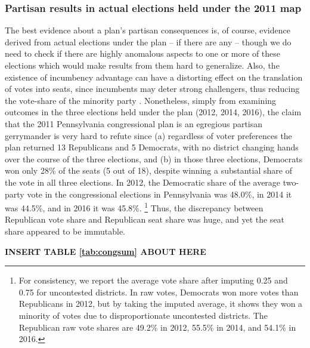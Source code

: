             \subsubsection*{Partisan results in actual elections held under the 2011 map}
%
    The best evidence about a plan’s partisan consequences is, of course, evidence derived from actual elections under the plan -- if there are any -- though we do need to check if there are highly anomalous aspects to one or more of these elections which would make results from them hard to generalize. Also, the existence of incumbency advantage can have a distorting effect on the translation of votes into seats, since incumbents may deter strong challengers, thus reducing the vote-share of the minority party \citep{Jacobson_Kernell_1981, Abramowitz1991}. Nonetheless, simply from examining outcomes in the three elections held under the plan (2012, 2014, 2016), the claim that the 2011 Pennsylvania congressional plan is an egregious partisan gerrymander is very hard to refute since (a) regardless of voter preferences the plan returned 13 Republicans and 5 Democrats, with no district changing hands over the course of the three elections, and (b) in those three elections, Democrats won only 28\% of the seats (5 out of 18), despite winning a substantial share of the vote in all three elections. In 2012, the Democratic share of the average two-party vote in the congressional elections in Pennsylvania was 48.0\%, in 2014 it was 44.5\%, and in 2016 it was 45.8\%. 
        \footnote{For consistency, we report the average vote share after imputing 0.25 and 0.75 for uncontested districts. In raw votes, Democrats won more votes than Republicans in 2012, but by taking the imputed average, it shows they won a minority of votes due to disproportionate uncontested districts. The Republican raw vote shares are 49.2\% in 2012, 55.5\% in 2014, and 54.1\% in 2016.}
    Thus, the discrepancy between Republican vote share and Republican seat share was huge, and yet the seat share appeared to be immutable.
\par
    
        \begin{center}\textbf{INSERT TABLE \ref{tab:congsum} ABOUT HERE} \end{center}
\par
